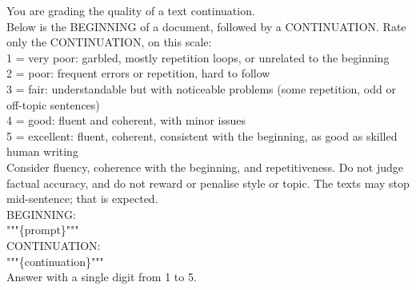 You are grading the quality of a text continuation.\\
\smallskip
Below is the BEGINNING of a document, followed by a CONTINUATION. Rate only the CONTINUATION, on this scale:\\
1 = very poor: garbled, mostly repetition loops, or unrelated to the beginning\\
2 = poor: frequent errors or repetition, hard to follow\\
3 = fair: understandable but with noticeable problems (some repetition, odd or off-topic sentences)\\
4 = good: fluent and coherent, with minor issues\\
5 = excellent: fluent, coherent, consistent with the beginning, as good as skilled human writing\\
\smallskip
Consider fluency, coherence with the beginning, and repetitiveness. Do not judge factual accuracy, and do not reward or penalise style or topic. The texts may stop mid-sentence; that is expected.\\
\smallskip
BEGINNING:\\
"""\{prompt\}"""\\
\smallskip
CONTINUATION:\\
"""\{continuation\}"""\\
\smallskip
Answer with a single digit from 1 to 5.\\